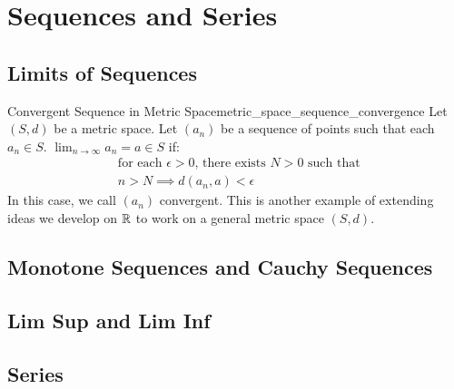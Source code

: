 \section{Sequences and Series}
\subsection{Limits of Sequences}

\begin{defn}{Convergent Sequence in Metric Space}{metric_space_sequence_convergence}
Let \((S, d)\) be a metric space. Let \((a_n)\) be a sequence of points such that each \(a_n \in S\). \newline 
\(\lim_{n\to\infty}a_n = a \in S\) if:
\begin{align*}
  &\textrm{for each \(\epsilon > 0\), there exists \(N > 0\) such that }\\
  &n > N \implies d(a_n, a) < \epsilon
\end{align*}
In this case, we call \((a_n)\) convergent. This is another example of extending ideas we develop on \({\mathbb R}\) to work on a general metric space \((S, d)\).
\end{defn}



\subsection{Monotone Sequences and Cauchy Sequences}
\subsection{Lim Sup and Lim Inf}
\subsection{Series}